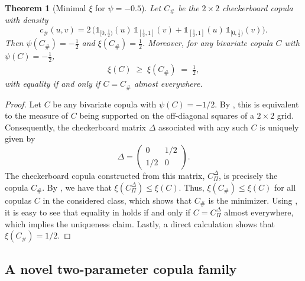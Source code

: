 \documentclass{article}
\newtheorem{theorem}{Theorem}[section]
\newcommand{\1}{\mathds{1}}
\begin{document}
\begin{theorem}[Minimal $\xi$ for $\psi=-0.5$]\label{thm:checkerboard}
Let $C_{\#}$ be the $2\times2$ checkerboard copula with density
\[
c_{\#}(u,v)
= 2\,\Big(\1_{[0,\frac12)}(u)\,\1_{[\frac12,1]}(v)
      +\1_{[\frac12,1]}(u)\,\1_{[0,\frac12)}(v)\Big).
\]
Then $\psi(C_{\#})=-\tfrac12$ and $\xi(C_{\#})=\tfrac12$.
Moreover, for any bivariate copula $C$ with $\psi(C)=-\tfrac12$,
\begin{align}\label{eq:checkerboard_minimality}
\xi(C)\;\ge\;\xi(C_{\#}) \;=\; \tfrac12,
\end{align}
with equality if and only if $C=C_{\#}$ almost everywhere.
\end{theorem}

\begin{proof}
Let $C$ be any bivariate copula with $\psi(C) = -1/2$.
By \cite[Thm.~3.2]{fuchs2019lower}, this is equivalent to the measure of $C$ being supported on the off-diagonal squares of a $2 \times 2$ grid.
Consequently, the checkerboard matrix $\Delta$ associated with any such $C$ is uniquely given by
\[
    \Delta = \begin{pmatrix} 0 & 1/2 \\ 1/2 & 0 \end{pmatrix}.
\]
The checkerboard copula constructed from this matrix, $C_{\Pi}^{\Delta}$, is precisely the copula $C_{\#}$.
By \cite[Thm.~4.1]{rockel2025measures}, we have that $\xi(C_{\Pi}^{\Delta}) \le \xi(C)$.
Thus, $\xi(C_{\#}) \le \xi(C)$ for all copulas $C$ in the considered class, which shows that $C_{\#}$ is the minimizer.
Using \cite[Thm. \& Cor.]{ansarifuchs2022asimpleextension}, it is easy to see that equality in \cite[Formula (18) \& Thm.~4.1]{rockel2025measures} holds if and only if $C = C_{\Pi}^{\Delta}$ almost everywhere, which implies the uniqueness claim.
Lastly, a direct calculation shows that $\xi(C_{\#}) = 1/2$.
\end{proof}

\subsection{A novel two-parameter copula family}
\label{sec:two_param_copula}
\end{document}
